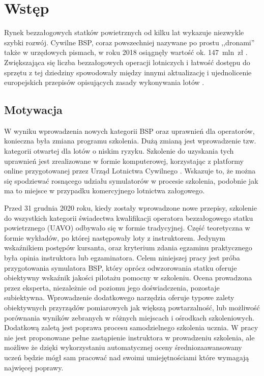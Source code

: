 \newpage
\section{Wstęp}
Rynek bezzałogowych statków powietrznych od kilku lat wykazuje niezwykle szybki rozwój. Cywilne BSP, coraz powszechniej nazywane po prostu ,,dronami'' także w urzędowych pismach, w roku 2018 osiągnęły wartość ok. 147~mln~zł \cite{bialaksiega2019}. Zwiększająca się liczba bezzałogowych operacji lotniczych i łatwość dostępu do sprzętu z tej dziedziny spowodowały między innymi aktualizację i ujednolicenie europejskich przepisów opisujących zasady wykonywania lotów \cite{eu-945-2019}.

\subsection{Motywacja}
W wyniku wprowadzenia nowych kategorii BSP oraz uprawnień dla operatorów, konieczna była zmiana programu szkolenia. Dużą zmianą jest wprowadzenie tzw. kategorii otwartej dla lotów o niskim ryzyku. Szkolenie do uzyskania tych uprawnień jest zrealizowane w formie komputerowej, korzystając z platformy online przygotowanej przez Urząd Lotnictwa Cywilnego \cite{ulc2019}. Wskazuje to, że można się spodziewać rosnącego udziału symulatorów w procesie szkolenia, podobnie jak ma to miejsce w przypadku komercyjnego lotnictwa załogowego.

Przed 31 grudnia 2020 roku, kiedy zostały wprowadzone nowe przepisy, szkolenie do wszystkich kategorii świadectwa kwalifikacji operatora bezzałogowego statku powietrznego (UAVO) odbywało się w formie tradycyjnej. Część teoretyczna w formie wykładów, po której następowały loty z instruktorem. Jedynym wskaźnikiem postępów kursanta, oraz kryterium zdania egzaminu praktycznego była opinia instruktora lub egzaminatora. Celem niniejszej pracy jest próba przygotowania symulatora BSP, który oprócz odwzorowania statku oferuje obiektywny wskaźnik jakości pilotażu pomocny w szkoleniu. Ocena prowadzona przez eksperta, niezależnie od poziomu jego doświadczenia, pozostaje subiektywna. Wprowadzenie dodatkowego narzędzia oferuje typowe zalety obiektywnych przyrządów pomiarowych jak większą powtarzalność, lub możliwość porównania wyników zebranych w różnych miejscach i ośrodkach szkoleniowych. Dodatkową zaletą jest poprawa procesu samodzielnego szkolenia ucznia. W pracy nie jest proponowane pełne zastąpienie instruktora w prowadzeniu szkolenia, ale możliwe że dzięki wykorzystaniu automatycznej oceny średniozaawansowany uczeń będzie mógł sam pracować nad swoimi umiejętnościami które wymagają najwięcej poprawy.

